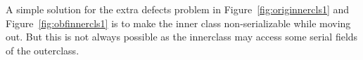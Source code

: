 \documentclass[twocolumn]{article}
\begin{document}
A simple solution for the extra defects problem in Figure~\ref{fig:originnercls1} and Figure~\ref{fig:obfinnercls1} is to make the inner class non-serializable
while moving out. But this is not always possible as the innerclass may access some serial fields of the outerclass. 
\begin{figure}[ht!]
\centering
{}
\end{figure}
\end{document}

